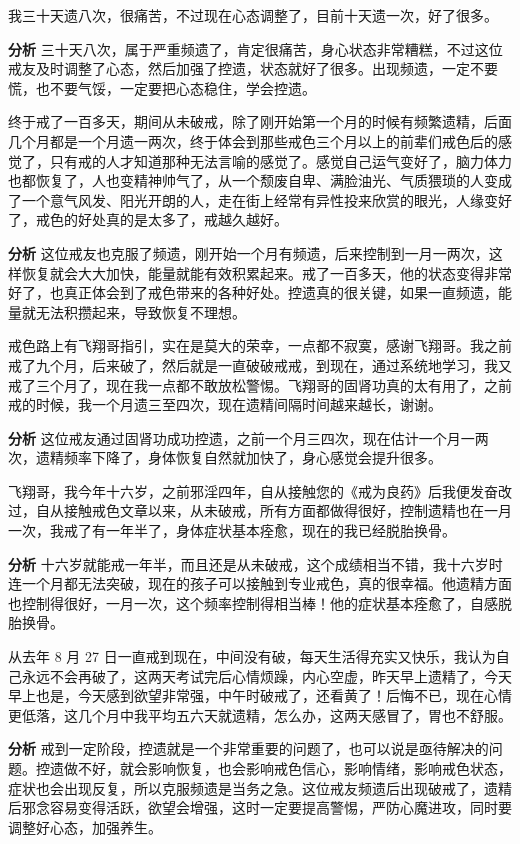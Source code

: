 \begin{case}
    我三十天遗八次，很痛苦，不过现在心态调整了，目前十天遗一次，好了很多。

    \textbf{分析} 三十天八次，属于严重频遗了，肯定很痛苦，身心状态非常糟糕，不过这位戒友及时调整了心态，然后加强了控遗，状态就好了很多。出现频遗，一定不要慌，也不要气馁，一定要把心态稳住，学会控遗。
\end{case}

\begin{case}
    终于戒了一百多天，期间从未破戒，除了刚开始第一个月的时候有频繁遗精，后面几个月都是一个月遗一两次，终于体会到那些戒色三个月以上的前辈们戒色后的感觉了，只有戒的人才知道那种无法言喻的感觉了。感觉自己运气变好了，脑力体力也都恢复了，人也变精神帅气了，从一个颓废自卑、满脸油光、气质猥琐的人变成了一个意气风发、阳光开朗的人，走在街上经常有异性投来欣赏的眼光，人缘变好了，戒色的好处真的是太多了，戒越久越好。

    \textbf{分析} 这位戒友也克服了频遗，刚开始一个月有频遗，后来控制到一月一两次，这样恢复就会大大加快，能量就能有效积累起来。戒了一百多天，他的状态变得非常好了，也真正体会到了戒色带来的各种好处。控遗真的很关键，如果一直频遗，能量就无法积攒起来，导致恢复不理想。
\end{case}

\begin{case}
    戒色路上有飞翔哥指引，实在是莫大的荣幸，一点都不寂寞，感谢飞翔哥。我之前戒了九个月，后来破了，然后就是一直破破戒戒，到现在，通过系统地学习，我又戒了三个月了，现在我一点都不敢放松警惕。飞翔哥的固肾功真的太有用了，之前戒的时候，我一个月遗三至四次，现在遗精间隔时间越来越长，谢谢。

    \textbf{分析} 这位戒友通过固肾功成功控遗，之前一个月三四次，现在估计一个月一两次，遗精频率下降了，身体恢复自然就加快了，身心感觉会提升很多。
\end{case}

\begin{case}
    飞翔哥，我今年十六岁，之前邪淫四年，自从接触您的《戒为良药》后我便发奋改过，自从接触戒色文章以来，从未破戒，所有方面都做得很好，控制遗精也在一月一次，我戒了有一年半了，身体症状基本痊愈，现在的我已经脱胎换骨。

    \textbf{分析} 十六岁就能戒一年半，而且还是从未破戒，这个成绩相当不错，我十六岁时连一个月都无法突破，现在的孩子可以接触到专业戒色，真的很幸福。他遗精方面也控制得很好，一月一次，这个频率控制得相当棒！他的症状基本痊愈了，自感脱胎换骨。
\end{case}

\begin{case}
    从去年 8 月 27 日一直戒到现在，中间没有破，每天生活得充实又快乐，我认为自己永远不会再破了，这两天考试完后心情烦躁，内心空虚，昨天早上遗精了，今天早上也是，今天感到欲望非常强，中午时破戒了，还看黄了！后悔不已，现在心情更低落，这几个月中我平均五六天就遗精，怎么办，这两天感冒了，胃也不舒服。

    \textbf{分析} 戒到一定阶段，控遗就是一个非常重要的问题了，也可以说是亟待解决的问题。控遗做不好，就会影响恢复，也会影响戒色信心，影响情绪，影响戒色状态，症状也会出现反复，所以克服频遗是当务之急。这位戒友频遗后出现破戒了，遗精后邪念容易变得活跃，欲望会增强，这时一定要提高警惕，严防心魔进攻，同时要调整好心态，加强养生。
\end{case}

